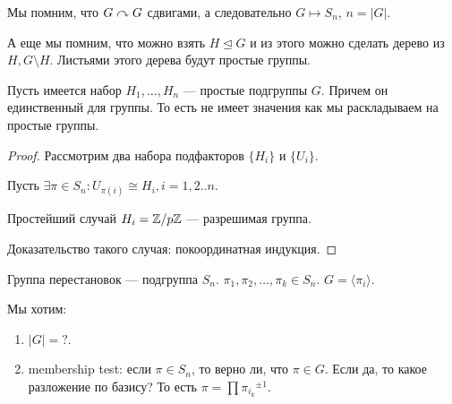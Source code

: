 Мы помним, что $G \curvearrowright G$ сдвигами, а следовательно  $G \mapsto S_n$,  $n = |G|$. 

А еще мы помним, что  можно взять $H \trianglelefteq G$ и из этого можно сделать дерево из $H, G \setminus H$. Листьями этого дерева будут простые группы. 

\begin{theorem}
    Пусть имеется набор $H_1, \ldots, H_n$ --- простые подгруппы $G$. Причем он единственный для группы. То есть не имеет значения как мы раскладываем на простые группы.
\end{theorem}
\begin{proof}
    Рассмотрим два набора подфакторов $\{H_i\}$ и  $\{U_i\}$.

    Пусть  $\exists \pi \in S_n\!: U_{\pi(i)} \cong H_i, i = 1,2..n$.

    Простейший случай  $H_i = \mathbb{Z} / p \mathbb{Z}$ --- разрешимая группа.
    
    Доказательство такого случая: покоординатная индукция.
\end{proof}
\begin{definition}
    Группа перестановок --- подгруппа $S_n$.
     $\pi_1, \pi_2, \ldots, \pi_k \in S_n$. $G = \langle \pi_i \rangle$.
\end{definition}

Мы хотим:
\begin{enumerate}
    \item $|G| = ?$.
    \item membership test: если  $\pi \in S_n$, то верно ли, что  $\pi \in G$. Если да, то какое разложение по базису? То есть $\pi = \prod {\pi_{i_k}}^{\pm 1}$.
\end{enumerate}

